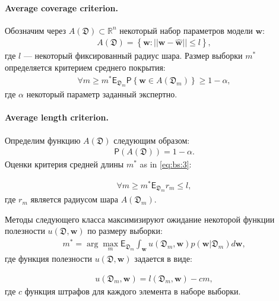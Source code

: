 \paragraph{Average coverage criterion.}
Обозначим через $A\left(\mathfrak{D}\right) \subset \mathbb{R}^n$ некоторый набор параметров модели $\textbf{w}$:
\[
\label{eq:bs:2}
\begin{aligned}
	A\left(\mathfrak{D}\right) = \left\{\textbf{w}:||\textbf{w} - \hat{\textbf{w}}||\leq l\right\},
\end{aligned}
\]
где $l$ --- некоторый фиксированный радиус шара.
Размер выборки $m^*$ определяется критерием среднего покрытия:
\[
\label{eq:bs:3}
\begin{aligned}
	\forall m \geq m^*    \mathsf{E}_{\mathfrak{D}_m}\mathsf{P}\left\{\textbf{w} \in A\left(\mathfrak{D}_m\right)\right\} \geq 1-\alpha,
\end{aligned}
\]
где $\alpha$ некоторый параметр заданный экспертно.
	
\paragraph{Average length criterion.}
Определим функцию $A\left(\mathfrak{D}\right)$ следующим образом:
\[
\label{eq:bs:4}
\begin{aligned}
	\mathsf{P}\left(A\left(\mathfrak{D}\right)\right) =  1- \alpha.
\end{aligned}
\]
Оценки критерия средней длины $m^*$ as in \eqref{eq:bs:3}:
	
\[
\label{eq:bs:5}
\begin{aligned}
	\forall m \geq m^*    \mathsf{E}_{\mathfrak{D}_m}r_m\leq l,
\end{aligned}
\]
где $r_m$ является радиусом шара $A\left(\mathfrak{D}_{m}\right)$.

Методы следующего класса максимизируют ожидание некоторой функции полезности $u\left(\mathfrak{D}, \textbf{w}\right)$ по размеру выборки:
\[
\label{eq:bs:6}
\begin{aligned}
	m^* = \arg\max_{m} \mathsf{E}_{\mathfrak{D}_m}\int_{\textbf{w}}u\left(\mathfrak{D}_m, \textbf{w}\right)p(\textbf{w}|\mathfrak{D}_m)d\textbf{w},
\end{aligned}
\]
где функция полезности $u\left(\mathfrak{D}, \textbf{w}\right)$ задается в виде:

\[
\label{eq:bs:7}
\begin{aligned}
	u\left(\mathfrak{D}_m, \textbf{w}\right) = l\left(\mathfrak{D}_m, \textbf{w}\right) - cm,
\end{aligned}
\]
 где $c$ функция штрафов для каждого элемента в наборе выборки.
	 
